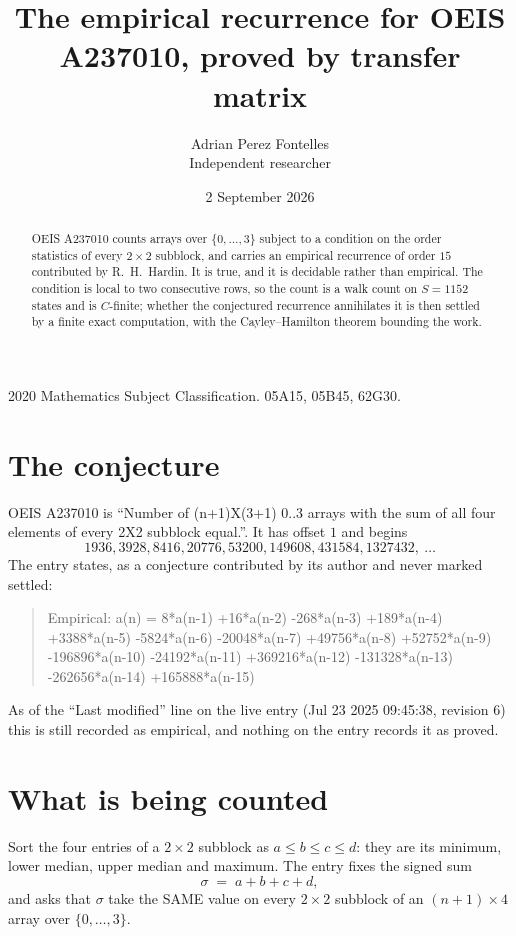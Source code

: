 \documentclass[11pt,a4paper]{article}
\title{The empirical recurrence for OEIS A237010, proved by transfer matrix}
\author{Adrian Perez Fontelles\\ \small Independent researcher}
\date{2 September 2026}
\theoremstyle{plain}
\theoremstyle{definition}
\begin{document}
\maketitle

\begin{abstract}
OEIS A237010 counts arrays over $\{0,\dots,3\}$ subject to a condition on the order
statistics of every $2\times2$ subblock, and carries an empirical recurrence of order
$15$ contributed by R.~H.~Hardin. It is true, and it is decidable rather than empirical.
The condition is local to two consecutive rows, so the count is a walk count on $S=1152$
states and is $C$-finite; whether the conjectured recurrence annihilates it is then settled by
a finite exact computation, with the Cayley--Hamilton theorem bounding the work.
\end{abstract}

\noindent\small 2020 Mathematics Subject Classification. 05A15, 05B45, 62G30.\normalsize

\section{The conjecture}

OEIS A237010 is ``Number of (n+1)X(3+1) 0..3 arrays with the sum of all four elements of every 2X2 subblock equal.''. It has offset $1$ and begins
\[
1936, 3928, 8416, 20776, 53200, 149608, 431584, 1327432,\ \dots
\]
The entry states, as a conjecture contributed by its author and never marked settled:
\begin{quote}
Empirical: a(n) = 8*a(n-1) +16*a(n-2) -268*a(n-3) +189*a(n-4) +3388*a(n-5) -5824*a(n-6) -20048*a(n-7) +49756*a(n-8) +52752*a(n-9) -196896*a(n-10) -24192*a(n-11) +369216*a(n-12) -131328*a(n-13) -262656*a(n-14) +165888*a(n-15)
\end{quote}
As of the ``Last modified'' line on the live entry (Jul 23 2025 09:45:38, revision 6) this is still
recorded as empirical, and nothing on the entry records it as proved.

\section{What is being counted}

Sort the four entries of a $2\times2$ subblock as $a\le b\le c\le d$: they
are its minimum, lower median, upper median and maximum. The entry fixes the signed sum
\[
\sigma\;=\;a+b+c+d,
\]
and asks that $\sigma$ take the SAME value on every $2\times2$ subblock of an
$(n+1)\times4$ array over $\{0,\dots,3\}$.
\end{document}
